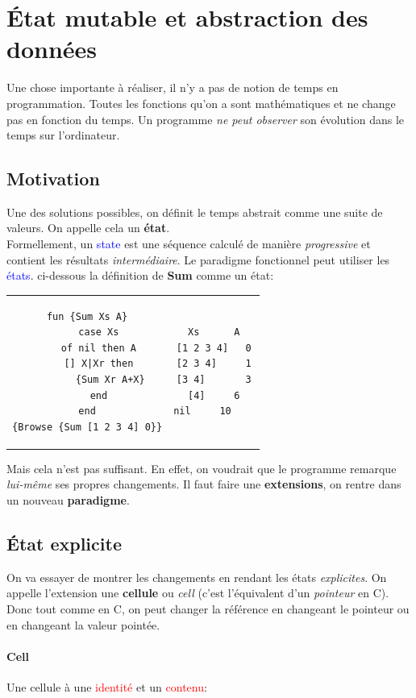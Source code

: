 \documentclass{report}
\begin{document}
\chapter{État mutable et abstraction des données}
Une chose importante à réaliser, il n'y a pas de notion de temps en programmation. Toutes les fonctions qu'on a sont mathématiques et ne change pas en fonction du temps. Un programme \textit{ ne peut observer} son évolution dans le temps sur l'ordinateur.

\section{Motivation}
Une des solutions possibles, on définit le temps abstrait comme une suite de valeurs. On appelle cela un \textbf{état}. \\
Formellement, un \textcolor{blue}{state} est une séquence calculé de manière \textit{progressive} et contient les résultats \textit{intermédiaire}. Le paradigme fonctionnel peut utiliser les \textcolor{blue}{états}. ci-dessous la définition de \textbf{Sum} comme un état:
\begin{center}
\begin{tabular}{c|c}
\begin{lstlisting}[escapechar=\%]
fun {Sum Xs A}
	case Xs
	of nil then A
	[] X|Xr then
		{Sum Xr A+X}
	end
end
{Browse {Sum [1 2 3 4] 0}}
\end{lstlisting}
& \begin{lstlisting}[escapechar=\%]
Xs		A
[1 2 3 4]	0
[2 3 4]		1
[3 4]		3
[4]		6
nil		10    
\end{lstlisting}
\end{tabular}
\end{center}
Mais cela n'est pas suffisant. En effet, on voudrait que le programme remarque \textit{lui-même} ses propres changements. Il faut faire une \textbf{extensions}, on rentre dans un nouveau \textbf{paradigme}.

\section{État explicite}
On va essayer de montrer les changements en rendant les états \textit{explicites}. On appelle l'extension une \textbf{cellule} ou \textit{cell} (c'est l'équivalent d'un \textit{pointeur} en C).\\
Donc tout comme en C, on peut changer la référence en changeant le pointeur ou en changeant la valeur pointée.

\subsubsection{Cell}
Une cellule à une \textcolor{red}{identité} et un \textcolor{red}{contenu}:
\end{document}
